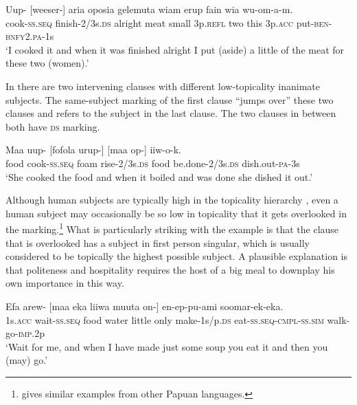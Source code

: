 \ea%
\label{ex:8:x1483}
\gll Uup-  [weeser-]  aria  oposia  gelemuta  wiam  erup fain  wia  wu-om-a-m.\\
cook-\textsc{ss}.\textsc{seq} finish-2/3s.\textsc{ds} alright  meat  small  3p.\textsc{refl} two this 3p.\textsc{acc} put-\textsc{ben}-\textsc{bnfy}2.\textsc{pa}-1s     \\
\glt`I cooked it and when it was finished alright I put (aside) a little of the meat for these two (women).'
\z


In  there are two intervening clauses with different low-topicality inanimate subjects. The same-subject marking of the first clause ``jumps over'' these two clauses and refers to the subject in the last clause. The two clauses in between both have \textsc{ds} marking. 

\ea%
\label{ex:8:x1476}
\gll Maa  uup- \textstyleEmphasizedVernacularWords{} [fofola  urup-]  [maa  op-] iiw-o-k.\\
food  cook-\textsc{ss}.\textsc{seq} foam rise-2/3s.\textsc{ds} food  be.done-2/3s.\textsc{ds} dish.out-\textsc{pa}-3s\hspace{-1mm}\\
\glt`She cooked the food and when it boiled and was done she dished it out.'
\z


Although human subjects are typically high in the topicality hierarchy \citep[364]{Givon1984}, even a human subject may occasionally be so low in topicality that it gets overlooked in the  marking.\footnote{\citet[236--237]{Reesink1983a} gives similar examples from other Papuan languages.} What is particularly striking with the example  is that the clause that is overlooked has a subject in first person singular, which is usually considered to be topically the highest possible subject. A plausible explanation is that politeness and hospitality requires the host of a big meal to downplay his own importance in this way. 

\ea%
\label{ex:8:x1477}
\gll Efa  arew-  [maa  eka  liiwa  muuta  on-] en-ep-pu-ami  soomar-ek-eka. \\
1s.\textsc{acc}  wait-\textsc{ss}.\textsc{seq} food water little only make-1s/p.\textsc{ds} eat-\textsc{ss}.\textsc{seq}-\textsc{cmpl}-\textsc{ss}.\textsc{sim} walk-go-\textsc{imp}.2p\\
\glt`Wait for me, and when I have made just some soup you eat it and then you (may) go.'
\z


